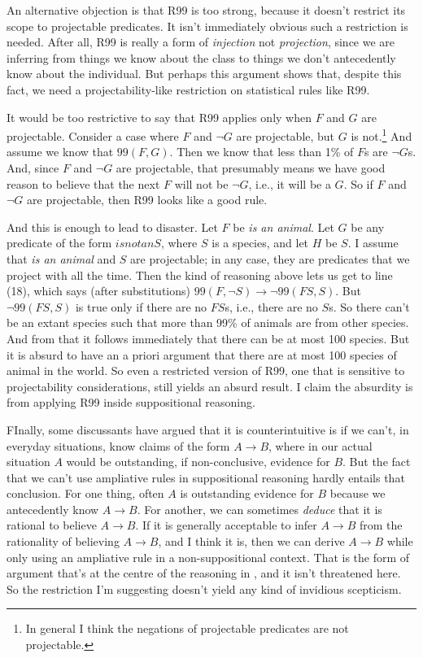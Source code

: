 An alternative objection is that R99 is too strong, because it doesn't restrict its scope to projectable predicates. It isn't immediately obvious such a restriction is needed. After all, R99 is really a form of \textit{injection} not \textit{projection}, since we are inferring from things we know about the class to things we don't antecedently know about the individual. But perhaps this argument shows that, despite this fact, we need a projectability-like restriction on statistical rules like R99.

It would be too restrictive to say that R99 applies only when $F$ and $G$ are projectable. Consider a case where $F$ and $\neg G$ are projectable, but $G$ is not.\footnote{In general I think the negations of projectable predicates are not projectable.} And assume we know that $99(F, G)$. Then we know that less than 1\% of $F$s are $\neg G$s. And, since $F$ and $\neg G$ are projectable, that presumably means we have good reason to believe that the next $F$ will not be $\neg G$, i.e., it will be a $G$. So if $F$ and $\neg G$ are projectable, then R99 looks like a good rule.

And this is enough to lead to disaster. Let $F$ be \textit{is an animal}. Let $G$ be any predicate of the form $is not an S$, where $S$ is a species, and let $H$ be $S$. I assume that \textit{is an animal} and $S$ are projectable; in any case, they are predicates that we project with all the time. Then the kind of reasoning above lets us get to line (18), which says (after substitutions) $99(F, \neg S) \rightarrow \neg 99(FS, S)$. But $\neg 99(FS, S)$ is true only if there are no $FS$s, i.e., there are no $S$s. So there can't be an extant species such that more than 99\% of animals are from other species. And from that it follows immediately that there can be at most 100 species. But it is absurd to have an a priori argument that there are at most 100 species of animal in the world. So even a restricted version of R99, one that is sensitive to projectability considerations, still yields an absurd result. I claim the absurdity is from applying R99 inside suppositional reasoning.

FInally, some discussants have argued that it is counterintuitive is if we can't, in everyday situations, know claims of the form $A \rightarrow B$, where in our actual situation $A$ would be outstanding, if non-conclusive, evidence for $B$. But the fact that we can't use ampliative rules in suppositional reasoning hardly entails that conclusion. For one thing, often $A$ is outstanding evidence for $B$ because we antecedently know $A \rightarrow B$. For another, we can sometimes \textit{deduce} that it is rational to believe $A \rightarrow B$. If it is generally acceptable to infer $A \rightarrow B$ from the rationality of believing $A \rightarrow B$, and I think it is, then we can derive $A \rightarrow B$ while only using an ampliative rule in a non-suppositional context. That is the form of argument that's at the centre of the reasoning in \citet{WeathersonSRE}, and it isn't threatened here. So the restriction I'm suggesting doesn't yield any kind of invidious scepticism.


